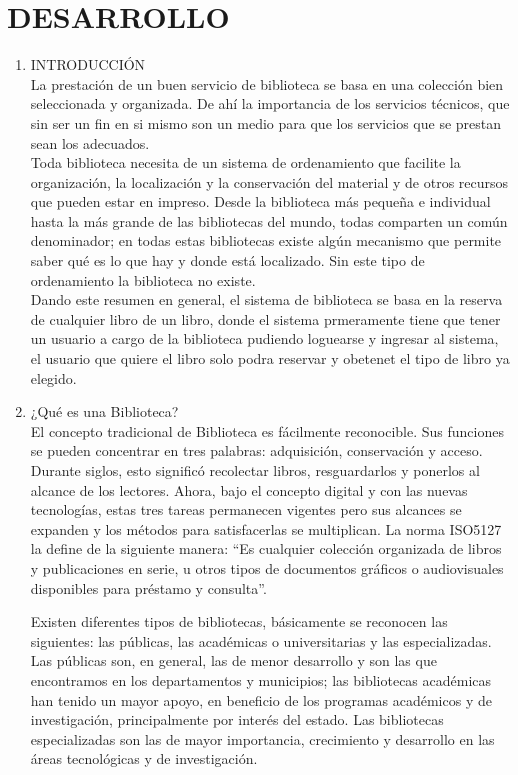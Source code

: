 \section{DESARROLLO} 

\begin{enumerate}[1.]
	\item INTRODUCCIÓN 
	\\ La prestación de un buen servicio de biblioteca se basa en una colección bien seleccionada y organizada. De ahí la importancia de los servicios técnicos, que sin ser un fin en si mismo son un medio para que los servicios que se prestan sean los adecuados.
	\\ Toda biblioteca necesita de un sistema de ordenamiento que facilite la organización, la localización y la conservación del material y de otros recursos que pueden estar en impreso. Desde la biblioteca más pequeña e individual hasta la más grande de las bibliotecas del mundo, todas comparten un común denominador; en todas estas bibliotecas existe algún mecanismo que permite saber qué es lo que hay y donde está localizado. Sin este tipo de ordenamiento la biblioteca no existe.
	\\ Dando este resumen en general, el sistema de biblioteca se basa en la reserva de cualquier libro de un libro, donde el sistema prmeramente tiene que tener un usuario a cargo de la biblioteca pudiendo loguearse y ingresar al sistema, el usuario que quiere el libro solo podra reservar y obetenet el tipo de libro ya elegido. 

\item ¿Qué es una Biblioteca? \\
El concepto tradicional de Biblioteca es fácilmente reconocible. Sus funciones se pueden concentrar en tres palabras: adquisición, conservación y acceso. Durante siglos, esto significó recolectar libros, resguardarlos y ponerlos al alcance de los lectores. Ahora, bajo el concepto digital y con las nuevas tecnologías, estas tres tareas permanecen vigentes pero sus alcances se expanden y los métodos para satisfacerlas se multiplican. La norma ISO5127 la define de la siguiente manera:
“Es cualquier colección organizada de libros y publicaciones en serie, u otros tipos de documentos gráficos o audiovisuales disponibles para préstamo y consulta”.

Existen diferentes tipos de bibliotecas, básicamente se reconocen las siguientes: las públicas, las académicas o universitarias y las especializadas. Las públicas son, en general, las de menor desarrollo y son las que encontramos en los departamentos y municipios; las bibliotecas académicas han tenido un mayor apoyo, en beneficio de los programas académicos y de investigación, principalmente por interés del estado. Las bibliotecas especializadas son las de mayor importancia, crecimiento y desarrollo en las áreas tecnológicas y de investigación.
    

\end{enumerate}
